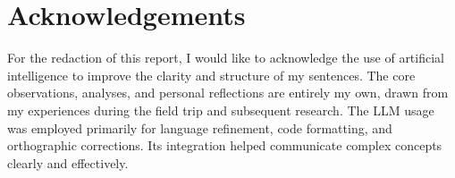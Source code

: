 \newpage
\section*{Acknowledgements}

For the redaction of this report, I would like to acknowledge the use of artificial intelligence to improve
the clarity and structure of my sentences. The core observations, analyses, and personal reflections
are entirely my own, drawn from my experiences during the field trip and subsequent research. The
LLM usage was employed primarily for language refinement, code formatting, and orthographic corrections.
Its integration helped communicate complex concepts clearly and effectively.


\newpage
